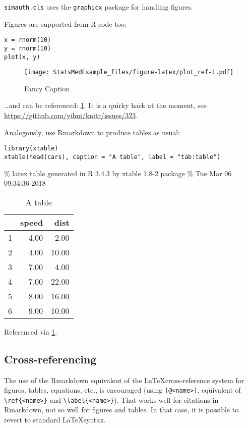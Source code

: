 \documentclass[times,]{simauth}
\begin{document}
\texttt{simauth.cls} uses the \texttt{graphicx} package for handling
figures.

Figures are supported from R code too:

\begin{verbatim}
x = rnorm(10)
y = rnorm(10)
plot(x, y)
\end{verbatim}

\begin{figure}
\centering
\texttt{[image: StatsMedExample\_files/figure-latex/plot\_ref-1.pdf]}
\caption{Fancy Caption\label{fig:plot}}
\end{figure}

\ldots{}and can be referenced: \ref{fig:plot}. It is a quirky hack at
the moment, see \href{here}{https://github.com/yihui/knitr/issues/323}.

Analogously, use Rmarkdown to produce tables as usual:

\begin{verbatim}
library(xtable)
xtable(head(cars), caption = "A table", label = "tab:table")
\end{verbatim}

\% latex table generated in R 3.4.3 by xtable 1.8-2 package \% Tue Mar
06 09:34:36 2018

\begin{table}[ht]
\centering
\begin{tabular}{rrr}
  \hline
 & speed & dist \\ 
  \hline
1 & 4.00 & 2.00 \\ 
  2 & 4.00 & 10.00 \\ 
  3 & 7.00 & 4.00 \\ 
  4 & 7.00 & 22.00 \\ 
  5 & 8.00 & 16.00 \\ 
  6 & 9.00 & 10.00 \\ 
   \hline
\end{tabular}
\caption{A table} 
\label{tab:table}
\end{table}

Referenced via \ref{tab:table}.

\subsection{Cross-referencing}\label{cross-referencing}

The use of the Rmarkdown equivalent of the \LaTeX cross-reference system
for figures, tables, equations, etc., is encouraged (using
\texttt{{[}@\textless{}name\textgreater{}{]}}, equivalent of
\texttt{\textbackslash{}ref\{\textless{}name\textgreater{}\}} and
\texttt{\textbackslash{}label\{\textless{}name\textgreater{}\}}). That
works well for citations in Rmarkdown, not so well for figures and
tables. In that case, it is possible to revert to standard
\LaTeX syntax.
\end{document}
